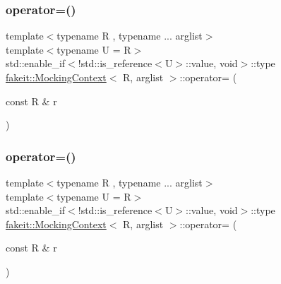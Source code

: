 \subsubsection{\texorpdfstring{operator=()}{operator=()}\hspace{0.1cm}{\footnotesize\ttfamily [18/27]}}
{\footnotesize\ttfamily template$<$typename R , typename ... arglist$>$ \\
template$<$typename U  = R$>$ \\
std\+::enable\+\_\+if$<$!std\+::is\+\_\+reference$<$U$>$\+::value, void$>$\+::type \mbox{\hyperlink{classfakeit_1_1MockingContext}{fakeit\+::\+Mocking\+Context}}$<$ R, arglist $>$\+::operator= (\begin{DoxyParamCaption}\item[{const R \&}]{r }\end{DoxyParamCaption})\hspace{0.3cm}{\ttfamily [inline]}}

\mbox{\label{classfakeit_1_1MockingContext_adfac3df2408adaa86efec81bd5533a6d}} 
\subsubsection{\texorpdfstring{operator=()}{operator=()}\hspace{0.1cm}{\footnotesize\ttfamily [19/27]}}
{\footnotesize\ttfamily template$<$typename R , typename ... arglist$>$ \\
template$<$typename U  = R$>$ \\
std\+::enable\+\_\+if$<$!std\+::is\+\_\+reference$<$U$>$\+::value, void$>$\+::type \mbox{\hyperlink{classfakeit_1_1MockingContext}{fakeit\+::\+Mocking\+Context}}$<$ R, arglist $>$\+::operator= (\begin{DoxyParamCaption}\item[{const R \&}]{r }\end{DoxyParamCaption})\hspace{0.3cm}{\ttfamily [inline]}}

\mbox{\label{classfakeit_1_1MockingContext_ad5e903b223858dbe67f1da1523ef0d60}} 
